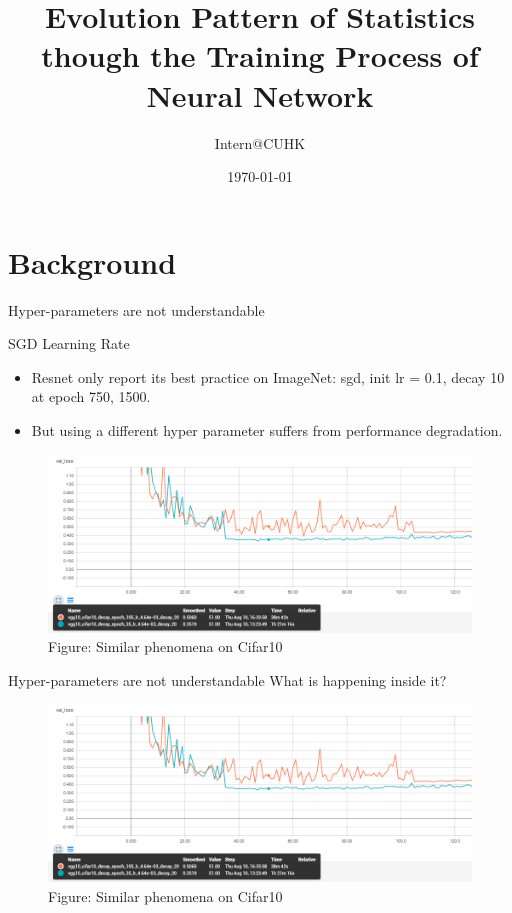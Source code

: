 \documentclass[notes]{beamer}
\title[Network Performance Prediction]{Evolution Pattern of Statistics \\ though the Training Process of Neural Network}
\author[Summer Intern]{Intern@CUHK}
\institute[\wuhao Zhejiang University]{\wuhao\monaco {Information Engineering, ZJU}}
\date[\today]{
   \today}
\begin{document}
\begin{frame}
  \titlepage
\end{frame}



\section{Background}
\begin{frame}{Hyper-parameters are not understandable} 
	\begin{block}{SGD Learning Rate}
		\begin{itemize}
			\item Resnet only report its best practice on ImageNet: sgd, init lr = 0.1, decay 10 at epoch 750, 1500.
			\item But using a different hyper parameter suffers from performance degradation.
		\end{itemize}
	\end{block}	
    \begin{figure}
		\includegraphics[width=.75\textwidth]{oncifar10.png} \\
        Figure: Similar phenomena on Cifar10 
		\end{figure}
\end{frame}


\begin{frame}{Hyper-parameters are not understandable}
	What is happening inside it?
    \begin{figure}
		\includegraphics[width=.75\textwidth]{oncifar10.png} \\
        Figure: Similar phenomena on Cifar10 
		\end{figure}
\end{frame} 
\end{document}
